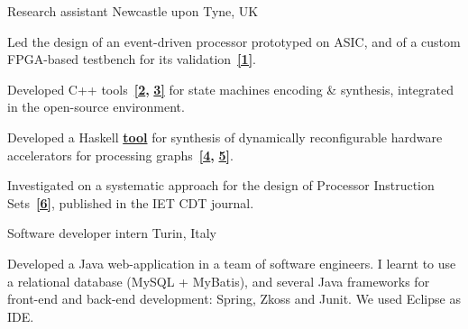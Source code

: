 \begin{cventries}
\cventry
{}
{\vspace{-9mm}Research assistant } %
{\vspace{-9mm} \normalcolor Newcastle upon Tyne, UK} %
{}
{	
\begin{cvitems}
\item {Led the design of an event-driven processor prototyped on 
ASIC, and of a custom FPGA-based testbench for its
validation~{\color{myblue}\href{https://github.com/tuura/papers/tree/master/date-2018}{\textbf{[1]}}}.}
\item {Developed C++
tools~{\color{myblue}\href{https://github.com/tuura/shutters}{\textbf{[2}}}{\color{myblue}\textbf{,}}
{\color{myblue}\href{https://github.com/tuura/scenco}{\textbf{3]}}}
for state machines encoding \& synthesis, integrated in the open-source
\href{https://workcraft.org/}{} 
environment.}
\item {Developed a Haskell 
{\color{myblue}\href{https://github.com/tuura/fantasi/tree/master/doc}{\textbf{tool}}}
for synthesis of dynamically reconfigurable hardware accelerators for 
processing 
graphs~{\color{myblue}\href{https://youtu.be/Z2w0hiHY3Us}{\textbf{[4}}}{\color{myblue}\textbf{,}}
{\color{myblue}\href{https://poets-project.org/publications}{\textbf{5]}}}.}
\item {Investigated on a systematic approach for the design of Processor 
Instruction 
Sets~{\color{myblue}\href{https://eprint.ncl.ac.uk/file_store/production/251075/92600BF7-92A0-4B22-897A-01892DDA9E2F.pdf}{\textbf{[6]}}},
 published in the IET CDT journal.}
\end{cvitems}
}
\vspace{-5mm}

\cventry
{}%
{\vspace{-9mm}Software developer intern }
{\vspace{-9mm} \normalcolor Turin, Italy}
{}
{
\begin{cvitems}
Developed a Java web-application in a team of software engineers. I learnt 
to use a relational database (MySQL + MyBatis), and several Java frameworks for 
front-end and back-end development: Spring, Zkoss and Junit. We used Eclipse as 
IDE.
\end{cvitems}
}


\end{cventries}
